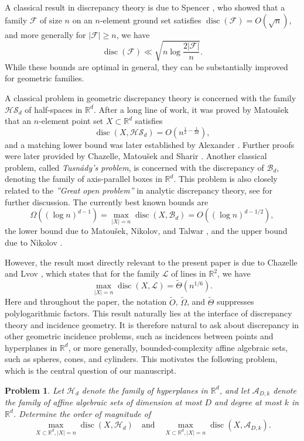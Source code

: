 \documentclass[11pt]{article}
\theoremstyle{plain}
\newtheorem{problem}[theorem]{Problem}
\theoremstyle{definition}
\DeclareMathOperator{\disc}{disc}
\begin{document}
	A classical result in discrepancy theory is due to Spencer \cite{Spencer}, who showed that a family $\mathcal F$ of size $n$ on an $n$-element ground set satisfies $\disc(\mathcal F)=O(\sqrt{n})$, and more generally for $|\mathcal F|\geq n$, we have $$\disc(\mathcal F)\ll \sqrt{n\log \frac{2|\mathcal{F}|}{n}}.$$ While these bounds are optimal in general, they can be substantially improved for geometric families. 
	
	A classical problem in geometric discrepancy theory is concerned with the family $\mathcal{HS}_d$ of half-spaces in $\mathbb{R}^d$. After a long line of work, it was proved by Matou\v{s}ek \cite{MatVCdim} that an $n$-element point set $X\subset \mathbb{R}^d$ satisfies $$\disc(X,\mathcal{HS}_d)=O(n^{\frac{1}{2}-\frac{1}{2d}}),$$ and a matching lower bound was later established by Alexander \cite{Alexander}. Further proofs were later provided by Chazelle, Matou\v{s}ek and Sharir \cite{CMS}. Another classical problem, called \emph{Tusn\'ady's problem}, is concerned with the discrepancy of  $\mathcal{B}_d$, denoting the family of axis-parallel boxes in $\mathbb{R}^d$. This problem is also closely related to the \emph{''Great open problem''} in analytic discrepancy theory, see \cite{MNT} for further discussion. The currently best known bounds are $$\Omega((\log n)^{d-1})=\max_{|X|=n}\disc(X,\mathcal B_d)=O((\log n)^{d-1/2}),$$ the lower bound  due to Matou\v{s}ek, Nikolov, and Talwar \cite{MNT}, and the upper bound due to Nikolov \cite{Nikolov}.
	
	However, the result most directly relevant to the present paper is due to Chazelle and Lvov \cite{ChL}, which states that for the family $\mathcal{L}$ of lines in $\mathbb{R}^2$, we have
	$$\max_{|X|=n}\disc(X,\mathcal{L})=\tilde{\Theta}(n^{1/6}).$$
	Here and throughout the paper, the notation $\widetilde{O}$, $\widetilde{\Omega}$, and $\widetilde{\Theta}$ suppresses polylogarithmic factors. This result naturally lies at the interface of discrepancy theory and incidence geometry. It is therefore natural to ask about discrepancy in other geometric incidence problems, such as incidences between points and hyperplanes in $\mathbb R^d$, or more generally,  bounded-complexity affine algebraic sets, such as spheres, cones, and cylinders. This motivates the following problem, which is the central question of our manuscript.
	
	\begin{problem}\label{problem:main}
		Let $\mathcal{H}_d$ denote the family of hyperplanes in $\mathbb{R}^d$, and let $\mathcal{A}_{D,k}$ denote the family of affine algebraic sets of dimension at most $D$ and degree at most $k$ in $\mathbb{R}^d$. Determine the order of magnitude of 
		$$\max_{X\subset \mathbb{R}^d, |X|=n}\disc(X,\mathcal{H}_d)\quad\text{and}\quad\max_{X\subset \mathbb{R}^d, |X|=n}\disc(X,\mathcal{A}_{D,k}).$$
	\end{problem}
	
\end{document}
